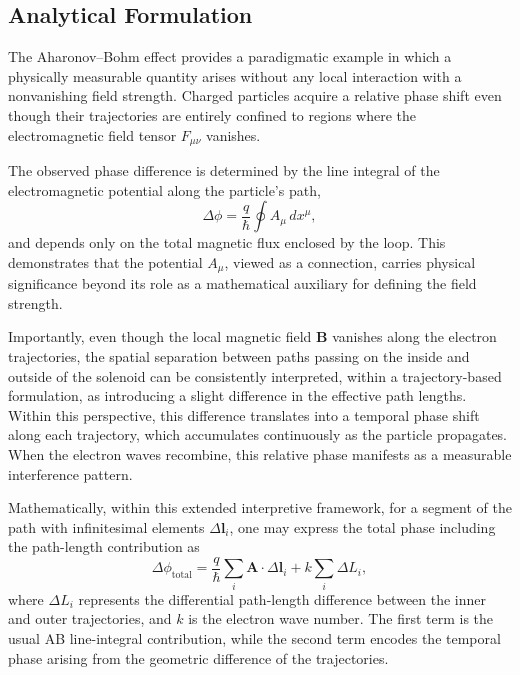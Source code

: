 \documentclass[%
 reprint,
 amsmath,amssymb,
 aps,
 prb,
]{revtex4-2}
\numberwithin{equation}{section}
\begin{document}
\subsection{Analytical Formulation}
\label{sec:ab_analytical_formulation}

The Aharonov--Bohm effect provides a paradigmatic example in which a physically measurable quantity arises without any local interaction with a nonvanishing field strength. Charged particles acquire a relative phase shift even though their trajectories are entirely confined to regions where the electromagnetic field tensor $F_{\mu\nu}$ vanishes.

The observed phase difference is determined by the line integral of the electromagnetic potential along the particle's path,
\begin{equation}
\Delta \phi = \frac{q}{\hbar} \oint A_\mu \, dx^\mu,
\label{eq:ab_phase}
\end{equation}
and depends only on the total magnetic flux enclosed by the loop. This demonstrates that the potential $A_\mu$, viewed as a connection, carries physical significance beyond its role as a mathematical auxiliary for defining the field strength.

Importantly, even though the local magnetic field \( \mathbf{B} \) vanishes along the electron trajectories, the spatial separation between paths passing on the inside and outside of the solenoid can be consistently interpreted, within a trajectory-based formulation, as introducing a slight difference in the effective path lengths. Within this perspective, this difference translates into a temporal phase shift along each trajectory, which accumulates continuously as the particle propagates. When the electron waves recombine, this relative phase manifests as a measurable interference pattern.

Mathematically, within this extended interpretive framework, for a segment of the path with infinitesimal elements \( \Delta \mathbf{l}_i \), one may express the total phase including the path-length contribution as
\begin{equation}
\Delta \phi_\mathrm{total} = \frac{q}{\hbar} \sum_i \mathbf{A} \cdot \Delta \mathbf{l}_i + k \sum_i \Delta L_i,
\end{equation}
where \( \Delta L_i \) represents the differential path-length difference between the inner and outer trajectories, and \( k \) is the electron wave number. The first term is the usual AB line-integral contribution, while the second term encodes the temporal phase arising from the geometric difference of the trajectories.
\end{document}

